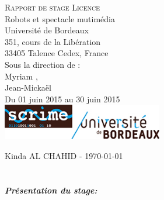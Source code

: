 \documentclass[10pt,a4paper]{report}
\begin{document}
\begin{titlepage} 
\begin{center}

        \textsc{\Huge Rapport de stage Licence}\\[1cm]
        {\huge Robots et spectacle mutimédia}\\[1cm]
        {\Large Université de Bordeaux \\ 
351, cours de la Libération\\ 33405 Talence Cedex, France}\\[1cm]
        {\Large Sous la direction de : \\}
        {\Large Myriam ,\\
         Jean-Mickaël }\\[1cm]
         {\Large Du 01 juin 2015 au 30 juin 2015\\}
    		\includegraphics[width=7cm]{image/scrime.jpg} 	
 
\end{center}

    \begin{flushbottom}
        \begin{flushleft}
            \large Kinda \textsc{AL CHAHID} - \today \\
        \end{flushleft}
    \end{flushbottom}

\end{titlepage}




\tableofcontents
{}

\printglossary[type=\acronymtype]


\chapter*{}
\paragraph{Présentation du stage:}
\end{document}
